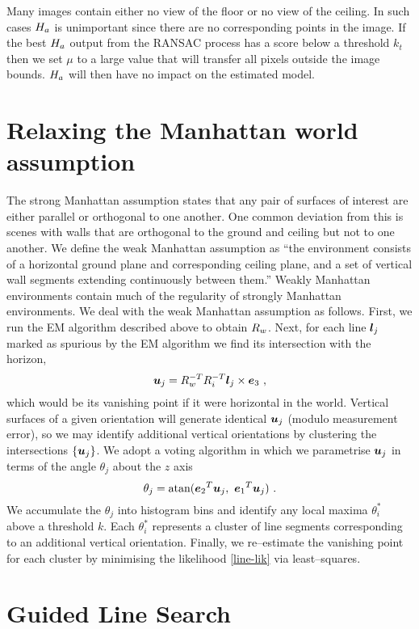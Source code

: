 Many images contain either no view of the floor or no view of the
ceiling. In such cases $\Hcf$ is unimportant since there are no
corresponding points in the image. If the best $\Hcf$ output from the
RANSAC process has a score below a threshold $k_t$ then we set $\mu$
to a large value that will transfer all pixels outside the image
bounds. $\Hcf$ will then have no impact on the estimated model.

\section{Relaxing the Manhattan world assumption}
The strong Manhattan assumption states that any pair of surfaces of
interest are either parallel or orthogonal to one another. One common
deviation from this is scenes with walls that are orthogonal to the
ground and ceiling but not to one another. We define the weak
Manhattan assumption as ``the environment consists of a horizontal
ground plane and corresponding ceiling plane, and a set of vertical
wall segments extending continuously between them.'' Weakly Manhattan
environments contain much of the regularity of strongly Manhattan
environments. We deal with the weak Manhattan assumption as
follows. First, we run the EM algorithm described above to obtain
$\SceneR$. Next, for each line $\LineSeg_j$ marked as spurious by the EM
algorithm we find its intersection with the horizon,
\begin{equation}
  \vect{u}_j = \SceneR^{-T} R_i^{-T} \LineSeg_j \times \ez ~,
\end{equation}
which would be its vanishing point if it were horizontal in the
world. Vertical surfaces of a given orientation will generate
identical $\vect{u}_j$ (modulo measurement error), so we may identify
additional vertical orientations by clustering the intersections
$\{\vect{u}_j\}$. We adopt a voting algorithm in which we parametrise
$\vect{u}_j$ in terms of the angle $\theta_j$ about the $z$ axis
\begin{equation}
  \theta_{j} = \mbox{atan}
  ({\ey}^T\vect{u}_j,~ {\ex}^T\vect{u}_j) ~.
\end{equation}
We accumulate the $\theta_j$ into histogram bins and identify any
local maxima $\theta_i^*$ above a threshold $k$. Each $\theta_i^*$
represents a cluster of line segments corresponding to an additional
vertical orientation. Finally, we re--estimate the vanishing point for
each cluster by minimising the likelihood \eqref{line-lik} via
least--squares.

\section{Guided Line Search}
